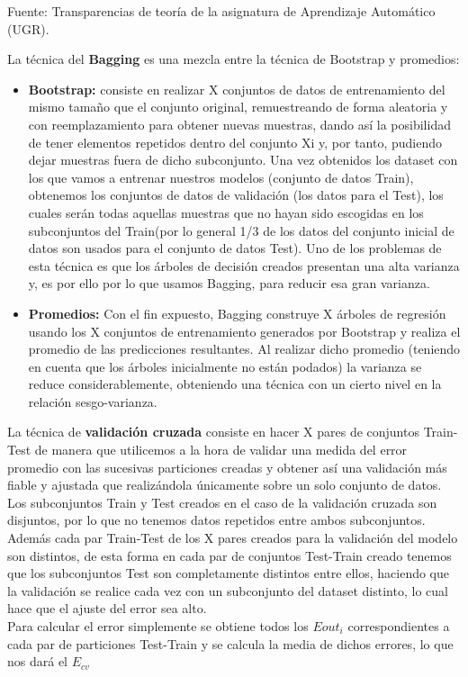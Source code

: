 Fuente: Transparencias de teoría de la asignatura de Aprendizaje Automático (UGR).

La técnica del \textbf{Bagging} es una mezcla entre la técnica de Bootstrap y promedios:
\begin{itemize}
	\item \textbf{Bootstrap:} consiste en realizar X conjuntos de datos de entrenamiento del mismo tamaño que el conjunto original, remuestreando de forma aleatoria y con reemplazamiento para obtener nuevas muestras, dando así la posibilidad de tener elementos repetidos dentro del conjunto Xi y, por tanto, pudiendo dejar muestras fuera de dicho subconjunto. Una vez obtenidos los dataset con los que vamos a entrenar nuestros modelos (conjunto de datos Train), obtenemos los conjuntos de datos de validación (los datos para el Test), los cuales serán todas aquellas muestras que no hayan sido escogidas en los subconjuntos del Train(por lo general 1/3 de los datos del conjunto inicial de datos son usados para el conjunto de datos Test). Uno de los problemas de esta técnica es que los árboles de decisión creados presentan una alta varianza y, es por ello por lo que usamos Bagging, para reducir esa gran varianza.
	
	\item \textbf{Promedios:} Con el fin expuesto, Bagging construye X árboles de regresión usando los X conjuntos de entrenamiento generados por Bootstrap y realiza el promedio de las predicciones resultantes. Al realizar dicho promedio (teniendo en cuenta que los árboles inicialmente no están podados) la varianza se reduce considerablemente, obteniendo una técnica con un cierto nivel en la relación sesgo-varianza.
\end{itemize}


La técnica de \textbf{validación cruzada} consiste en hacer X pares de conjuntos Train-Test de manera que utilicemos a la hora de validar una medida del error promedio con las sucesivas particiones creadas y obtener así una validación más fiable y ajustada que realizándola únicamente sobre un solo conjunto de datos. Los subconjuntos Train y Test creados en el caso de la validación cruzada son disjuntos, por lo que no tenemos datos repetidos entre ambos subconjuntos. Además cada par Train-Test de los X pares creados para la validación del modelo son distintos, de esta forma en cada par de conjuntos Test-Train creado tenemos que los subconjuntos Test son completamente distintos entre ellos, haciendo que la validación se realice cada vez con un subconjunto del dataset distinto, lo cual hace que el ajuste del error sea alto.\\
Para calcular el error simplemente se obtiene todos los $Eout_i$ correspondientes a cada par de particiones Test-Train y se calcula la media de dichos errores, lo que nos dará el $E_{cv}$ \\

